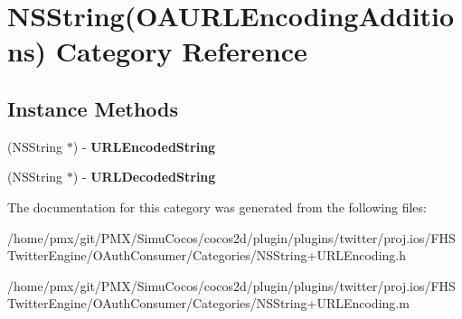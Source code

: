 \hypertarget{categoryNSString_07OAURLEncodingAdditions_08}{}\section{N\+S\+String(O\+A\+U\+R\+L\+Encoding\+Additions) Category Reference}
\label{categoryNSString_07OAURLEncodingAdditions_08}
\subsection*{Instance Methods}
\begin{DoxyCompactItemize}
\item 
\mbox{\label{categoryNSString_07OAURLEncodingAdditions_08_adba540e5054884fbd9dcf80f7b4d868c}} 
(N\+S\+String $\ast$) -\/ {\bfseries U\+R\+L\+Encoded\+String}
\item 
\mbox{\label{categoryNSString_07OAURLEncodingAdditions_08_ab0430deaab1af28bbb488933ebac5c49}} 
(N\+S\+String $\ast$) -\/ {\bfseries U\+R\+L\+Decoded\+String}
\end{DoxyCompactItemize}


The documentation for this category was generated from the following files\+:\begin{DoxyCompactItemize}
\item 
/home/pmx/git/\+P\+M\+X/\+Simu\+Cocos/cocos2d/plugin/plugins/twitter/proj.\+ios/\+F\+H\+S\+Twitter\+Engine/\+O\+Auth\+Consumer/\+Categories/N\+S\+String+\+U\+R\+L\+Encoding.\+h\item 
/home/pmx/git/\+P\+M\+X/\+Simu\+Cocos/cocos2d/plugin/plugins/twitter/proj.\+ios/\+F\+H\+S\+Twitter\+Engine/\+O\+Auth\+Consumer/\+Categories/N\+S\+String+\+U\+R\+L\+Encoding.\+m\end{DoxyCompactItemize}

